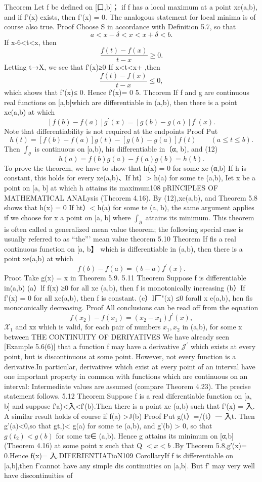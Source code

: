 Theorem Let f be defined on [口,b]； if f has a local maximum at a point xe(a,b), and if f’(x) exists, then f'(x) = 0. The analogous statement for local minima is of course also true. Proof Choose S in accordance with Definition 5.7, so that $$ a<x-\delta<x<x+\delta<b. $$ If x-6<t<x, then $$ {\frac{f(t)-f(x)}{t-x}}\geq0. $$ Letting t→X, we see that f′(x)≥0 If x<t<x+ ,then $$ {\frac{f(t)-f(x)}{t-x}}\leq0, $$ which shows that f'(x)≤ 0. Hence f′(x)= 0 5. Thcorem If f and g are continuous real functions on [a,b]which are differentiable in (a,b), then there is a point xe(a,b) at which $$ [f(b)-f(a)]g^{\prime}(x)=[g(b)-g(a)]f^{\prime}(x). $$ Note that differentiability is not required at the endpoints Proof Put $$ h(t)=[f(b)-f(a)]g(t)-[g(b)-g(a)]f(t)\qquad(a\leq t\leq b). $$ Then $\textstyle{\int}_{\theta}$ is continuous on [a,b), his differentiable in（α, b), and (12) $$ h(a)=f(b)g(a)-f(a)g(b)=h(b). $$ To prove the theorem, we have to show that h(x) = 0 for some xe (α,b) If h is constant, this holds for every xe(a,b)、If ht）> h(a) for some te (a,b), Iet x be a point on [a, b] at which h attains its maximum108 pRINCIPLES OF MATHEMATICAL ANALysis (Theorem 4.16). By (12),xe(a,b), and Theorem 5.8 shows that h(x) = 0 If ht）< h(a) for some te (a, b), the same argument applies if we choose for x a point on [a, b] where $\textstyle{\int_{\partial}}$ attains its minimum. This theorem is often called a generalized mean value theorem; the following special case is usually referred to as “the”’ mean value theorem 5.10 Theorem If fis a real continuous function on [a, b】 which is differentiable in (a,b), then there is a point xe(a,b) at which $$ f(b)-f(a)=(b-a)f^{\prime}(x). $$ Proot Take g(x) = x in Theorem 5.9. 5.11 Theorem Suppose f is differentiable in(a,b) (a）lf f(x) ≥0 for all xe (a,b), then f is monotonically increasing (b）If f'(x) = 0 for all xe(a,b), then f is constant. (c）I厂"(x) ≤0 forall x e(a,b), hen fis monotonically decreasing. Proof All conclusions can be read off from the equation $$ f(x_{2})-f(x_{1})=(x_{2}-x_{1})f^{\prime}(x), $$ ${\mathcal{X}}_{1}$ and xz which is valid, for each pair of numbers $x_{1},x_{2}$ in (a,b), for some x between THE CONTINUITY OF DERIYATIVES We have already seen [Example 5.6(6)] that a function f may have a derivative ${\mathcal{J}}^{\prime}$ which exists at every point, but is discontinuous at some point. However, not every function is a derivative.In particular, derivatives which exist at every point of an interval have one important property in common with functions which are continuous on an interval: Intermediate values are assumed (compare Theorem 4.23). The precise statement follows. 5.12 Theorem Suppose f is a real diferentiable function on [a, b] and suppose f′a)<入<f′(b).Then there is a point xe (a,b) such that f'(x) = 入. A similar result holds of course if f(a) >J(b) Proof Put g(t）=/(t）一 入t. Then g'(a)<0,so that gt,)< g(a) for some te (a,b), and g'(b) > 0, so that $g(t_{2})<g(b)$ for some tz∈ (a,b). Hence g attains its minimum on [α,b](Theorem 4.16) at some point x such that Q $<x<b$ .By Theorem 5.8,g′(x)= 0.Hence f(x)= 入.DIFERIENTIATioN109 CorollaryIf f is differentiable on [a,b],then f’cannot have any simple dis continuities on [a,b]. But f’ may very well have discontinuities of 